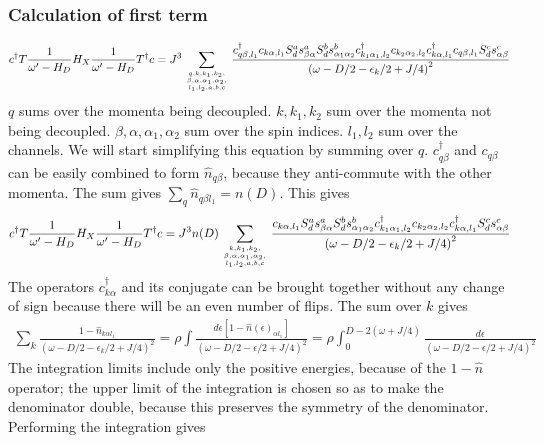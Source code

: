 \documentclass{revtex4-2}
\begin{document}
\subsubsection{Calculation of first term}
\begin{align}
	c^\dagger T \frac{1}{\omega^\prime - H_D} H_X \frac{1}{\omega^\prime - H_D} T^\dagger c = J^3\sum_{q, k, k_1,k_2,\atop{\beta, \alpha, \alpha_1,\alpha_2,\atop{l_1,l_2,a,b,c}}} \frac{c^\dagger_{q\beta,l_1} c_{k\alpha,l_1} S_d^a s^a_{\beta \alpha} S_d^b s^b_{\alpha_1 \alpha_2} c^\dagger_{k_1\alpha_1,l_2}c_{k_2 \alpha_2,l_2} c^\dagger_{k\alpha, l_1} c_{q\beta, l_1} S_d^c s^c_{\alpha \beta}}{\left(\omega - D/2 -\epsilon_k/2 + J/4\right)^2}
\end{align}
\(q\) sums over the momenta being decoupled. \(k, k_1,k_2\) sum over the momenta not being decoupled. \(\beta, \alpha, \alpha_1,\alpha_2\) sum over the spin indices. \(l_1,l_2\) sum over the channels. We will start simplifying this equation by summing over \(q\). \(c^\dagger_{q\beta}\) and \(c_{q\beta}\) can be easily combined to form \(\hat n_{q\beta}\), because they anti-commute with the other momenta. The sum gives \(\sum_q \hat n_{q\beta l_1} = n(D) \). This gives
\begin{align}
	c^\dagger T \frac{1}{\omega^\prime - H_D} H_X \frac{1}{\omega^\prime - H_D} T^\dagger c = J^3 n(D)\sum_{k, k_1,k_2,\atop{\beta, \alpha, \alpha_1,\alpha_2,\atop{l_1,l_2,a,b,c}}} \frac{c_{k\alpha,l_1} S_d^a s^a_{\beta \alpha} S_d^b s^b_{\alpha_1 \alpha_2} c^\dagger_{k_1\alpha_1,l_2}c_{k_2 \alpha_2,l_2} c^\dagger_{k\alpha, l_1} S_d^c s^c_{\alpha \beta}}{\left(\omega - D/2 -\epsilon_k/2 + J/4\right)^2}
\end{align}
The operators \(c^\dagger_{k\alpha}\) and its conjugate can be brought together without any change of sign because there will be an even number of flips. The sum over \(k\) gives
\begin{align}
	\sum_k \frac{1 - \hat n_{k\alpha l_1}}{\left(\omega - D/2 -\epsilon_k/2 + J/4\right)^2} =  \rho\int \frac{d\epsilon\left[1 - \hat n(\epsilon)_{\alpha l_1}\right] }{\left(\omega - D/2 -\epsilon/2 + J/4\right)^2} = \rho\int_0^{D-2\left( \omega + J/4 \right) } \frac{d\epsilon}{\left(\omega - D/2 -\epsilon/2 + J/4\right)^2}
\end{align}
The integration limits include only the positive energies, because of the \(1 - \hat n\) operator; the upper limit of the integration is chosen so as to make the denominator double, because this preserves the symmetry of the denominator. Performing the integration gives
\end{document}
